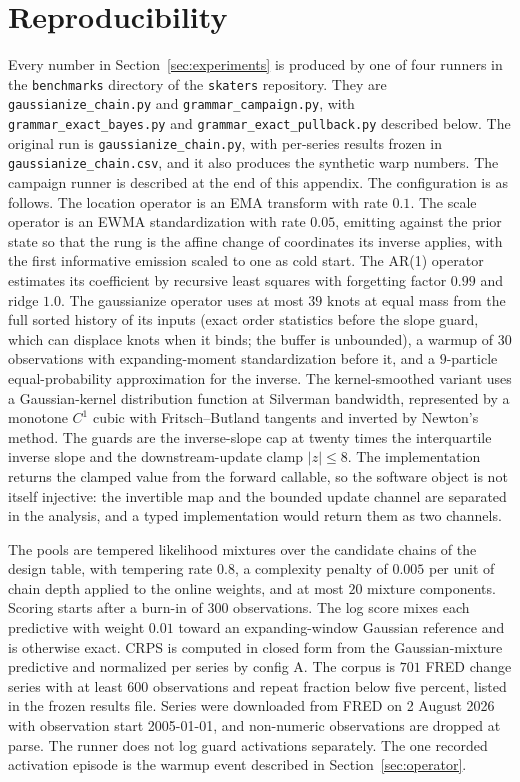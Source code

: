 \documentclass[11pt]{article}
\theoremstyle{remark}
\begin{document}
\section{Reproducibility}\label{app:repro}

Every number in Section~\ref{sec:experiments} is produced by one of four runners
in the \texttt{benchmarks} directory of the \texttt{skaters} repository. They are
\texttt{gaussianize\_chain.py} and \texttt{grammar\_campaign.py}, with
\texttt{grammar\_exact\_bayes.py} and \texttt{grammar\_exact\_pullback.py}
described below. The original run
is \texttt{gaussianize\_chain.py}, with per-series results frozen in
\texttt{gaussianize\_chain.csv}, and it also produces the synthetic warp numbers. The campaign runner is described at the end of this appendix. The
configuration is as follows. The location operator is an EMA transform with rate $0.1$.
The scale operator is an EWMA standardization with rate $0.05$, emitting against
the prior state so that the rung is the affine change of coordinates its inverse
applies, with the first informative emission scaled to one as cold start. The AR(1) operator
estimates its coefficient by recursive least squares with forgetting factor $0.99$ and
ridge $1.0$. The gaussianize operator uses at most $39$ knots at equal mass from the
full sorted history of its inputs (exact order statistics before the slope guard,
which can displace knots when it binds; the buffer is unbounded),
a warmup of
$30$ observations with expanding-moment standardization before it,
and a $9$-particle equal-probability approximation for the inverse. The kernel-smoothed
variant uses a Gaussian-kernel distribution function at Silverman bandwidth,
represented by a monotone $C^1$ cubic with Fritsch--Butland tangents and inverted by
Newton's method. The guards are the inverse-slope cap at twenty times the interquartile
inverse slope and the downstream-update clamp $|z| \le 8$. The implementation
returns the clamped value from the forward callable, so the software object is not
itself injective: the invertible map and the bounded update channel are separated in
the analysis, and a typed implementation would return them as two channels.

The pools are tempered likelihood mixtures over the candidate chains of the design
table, with tempering rate $0.8$, a complexity penalty of $0.005$ per unit of chain
depth applied to the online weights, and at most $20$ mixture components. Scoring
starts after a burn-in of $300$ observations. The log score mixes each predictive with
weight $0.01$ toward an expanding-window Gaussian reference and is otherwise exact.
CRPS is computed in closed form from the Gaussian-mixture predictive and normalized per
series by config A. The corpus is $701$ FRED change series with at least $600$
observations and repeat fraction below five percent, listed in the frozen results file.
Series were downloaded from FRED on 2 August 2026 with observation start 2005-01-01,
and non-numeric observations are dropped at parse.
The runner does not log guard activations separately. The one recorded activation
episode is the warmup event described in Section~\ref{sec:operator}.
\end{document}
